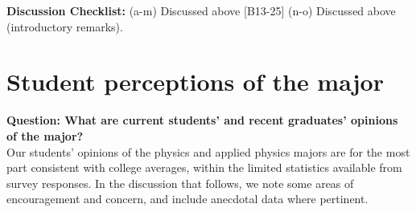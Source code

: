 \documentclass[12pt]{article}
\begin{document}
\noindent
{\bf Discussion Checklist:} (a-m) Discussed above [B13-25] (n-o)
Discussed above (introductory remarks).

\newpage
\section{Student perceptions of the major}
\label{sec:perceptions}

{\bf Question: What are current students' and recent graduates'
  opinions of the major? }\\

\noindent
Our students' opinions of the physics and applied physics majors are
for the most part consistent with college averages, within the limited
statistics available from survey responses.  In the discussion that
follows, we note some areas of encouragement and concern, and include
anecdotal data where pertinent.\\[3pt]

\end{document}
